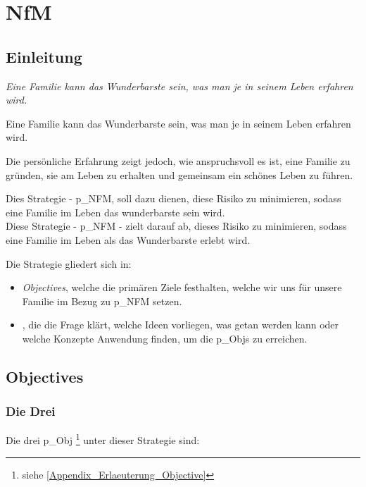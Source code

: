 \chapter{NfM}
\setcounter{section}{0}
\section{Einleitung}
\begin{center}
\textit{Eine Familie kann das Wunderbarste sein, was man je in seinem Leben erfahren wird.}	
\end{center}

Eine Familie kann das Wunderbarste sein, was man je in seinem Leben erfahren wird.

Die persönliche Erfahrung zeigt jedoch, wie anspruchsvoll es ist, eine Familie zu gründen, sie am Leben zu erhalten und gemeinsam ein schönes Leben zu führen.

Dies Strategie - \gls{p_NFM}, soll dazu dienen, diese Risiko zu minimieren, sodass eine Familie im Leben das wunderbarste sein wird.\\

Diese Strategie - \gls{p_NFM} - zielt darauf ab, dieses Risiko zu minimieren, sodass eine Familie im Leben als das Wunderbarste erlebt wird.

Die Strategie gliedert sich in:
\begin{itemize}
	\item \textit{Objectives}, welche die primären Ziele festhalten, welche wir uns für unsere Familie im Bezug zu \gls{p_NFM} setzen.
	\item \textit{}, die die Frage klärt, welche Ideen vorliegen, was getan werden kann oder welche Konzepte Anwendung finden, um die \glspl{p_Obj} zu erreichen.
\end{itemize}




\section{Objectives} 
\subsection{Die Drei}
Die drei \gls{p_Obj} \footnote{siehe \ref{Appendix_Erlaeuterung_Objective}} unter dieser Strategie sind:

